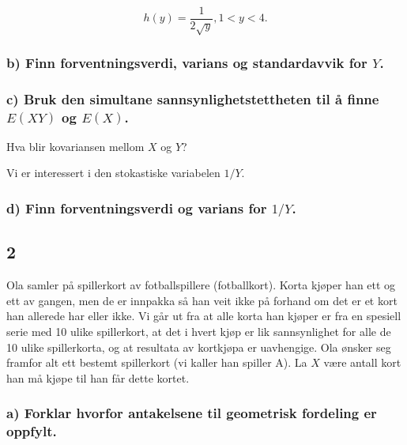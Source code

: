\documentclass[
  12pt,
  a4paper,
  DIV=11,
  numbers=noendperiod]{scrartcl}
\begin{document}
\[ h(y) = \frac{1}{2\sqrt{y}}, 1 < y < 4. \]

\subsubsection{\texorpdfstring{b) Finn forventningsverdi, varians og
standardavvik for
\(Y\).}{b) Finn forventningsverdi, varians og standardavvik for Y.}}\label{b-finn-forventningsverdi-varians-og-standardavvik-for-y.}

\subsubsection{\texorpdfstring{c) Bruk den simultane
sannsynlighetstettheten til å finne \(E(XY)\) og
\(E(X)\).}{c) Bruk den simultane sannsynlighetstettheten til å finne E(XY) og E(X).}}\label{c-bruk-den-simultane-sannsynlighetstettheten-til-uxe5-finne-exy-og-ex.}

Hva blir kovariansen mellom \(X\) og \(Y\)?

Vi er interessert i den stokastiske variabelen \(1/Y\).

\subsubsection{\texorpdfstring{d) Finn forventningsverdi og varians for
\(1/Y\).}{d) Finn forventningsverdi og varians for 1/Y.}}\label{d-finn-forventningsverdi-og-varians-for-1y.}

\subsection{2}\label{section-1}

Ola samler på spillerkort av fotballspillere (fotballkort). Korta kjøper
han ett og ett av gangen, men de er innpakka så han veit ikke på forhand
om det er et kort han allerede har eller ikke. Vi går ut fra at alle
korta han kjøper er fra en spesiell serie med 10 ulike spillerkort, at
det i hvert kjøp er lik sannsynlighet for alle de 10 ulike spillerkorta,
og at resultata av kortkjøpa er uavhengige. Ola ønsker seg framfor alt
ett bestemt spillerkort (vi kaller han spiller A). La \(X\) være antall
kort han må kjøpe til han får dette kortet.

\subsubsection{a) Forklar hvorfor antakelsene til geometrisk fordeling
er
oppfylt.}\label{a-forklar-hvorfor-antakelsene-til-geometrisk-fordeling-er-oppfylt.}
\end{document}
